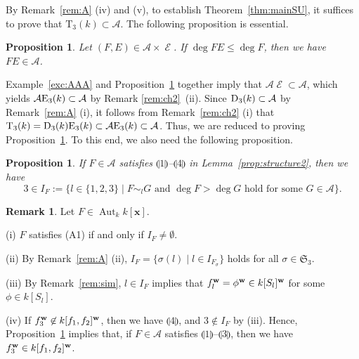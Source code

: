 \documentclass{amsart}
\theoremstyle{plain}
\newtheorem{prop}[thm]{Proposition}
\theoremstyle{definition}
\newtheorem{rem}[thm]{Remark}
\newcommand{\A}{\mathcal{A}}
\newcommand{\E }{{\mathop{\mathcal{E}}\nolimits}}
\newcommand{\Aut }{\mathop{\mathrm{Aut}}\nolimits}
\newcommand{\T }{\mathrm{T}}
\newcommand{\nd}{\noindent}
\newcommand{\x}{{\boldsymbol x}}
\newcommand{\w}{{\bf w}}
\newcommand{\kx}{k[\x]}
\newcommand{\sym}{\mathfrak{S}}
\begin{document}
By Remark~\ref{rem:A} (iv) and (v), 
to establish Theorem~\ref{thm:mainSU}, 
it suffices to prove that $\T _3(k)\subset \A $. 
The following proposition is essential. 



\begin{prop}\label{prop:key}
Let $(F,E)\in \A \times \E $. 
If $\deg FE\le \deg F$, then we have~$FE\in \A $. 
\end{prop}



Example~\ref{exc:AAA} and Proposition~\ref{prop:key} 
together 
imply that $\A \E \subset \A $, 
which yields $\A {\rm E}_3(k)\subset \A $ by Remark \ref{rem:ch2}~(ii). 
Since ${\rm D}_3(k)\subset \A $ by Remark~\ref{rem:A} (i), 
it follows from Remark~\ref{rem:ch2} (i) 
that $\T_3(k)={\rm D}_3(k){\rm E}_3(k)\subset \A {\rm E}_3(k)\subset \A $. 
Thus, 
we are reduced to proving Proposition~\ref{prop:key}. 
To this end, 
we also need the following proposition. 


\begin{prop}\label{prop:key2}
If $F\in \mathcal{A}$ satisfies 
$\llparenthesis 1 \rrparenthesis$--$\llparenthesis 4 \rrparenthesis$ 
in Lemma~{\rm \ref{prop:structure2}}, 
then we have 
$$
3\in I_F:=\{ l\in \{ 1,2,3\} \mid 
F\sim _lG\text{ and }\deg F>\deg G\text{ hold for some }G\in \A \} . 
$$
\end{prop}


\begin{rem}\label{rem:prop key2}\rm 
Let $F\in \Aut _k\kx $. 

\nd 
(i) $F$ satisfies (A1) if and only if $I_F\ne \emptyset $. 


\nd (ii) 
By Remark~\ref{rem:A} (ii), 
$I_F=\{ \sigma (l)\mid l\in I_{F_\sigma }\} $ 
holds for all $\sigma \in \sym _3$. 



\nd (iii) 
By Remark~\ref{rem:sim}, 
$l\in I_F$ implies that 
$f_l^{\w }=\phi ^{\w }\in k[S_l]^{\w }$ 
for some $\phi \in k[S_l]$. 



\nd (iv) 
If $f_3^{\w }\not\in k[f_1,f_2]^{\w }$, 
then we have 
$\llparenthesis 4 \rrparenthesis$, 
and $3\not\in I_F$ by (iii). 
Hence, Proposition~\ref{prop:key2} implies that, 
if $F\in \A $ satisfies 
$\llparenthesis 1 \rrparenthesis$--$\llparenthesis 3 \rrparenthesis$, 
then we have $f_3^{\w }\in k[f_1,f_2]^{\w }$. 
\end{rem}
\end{document}
